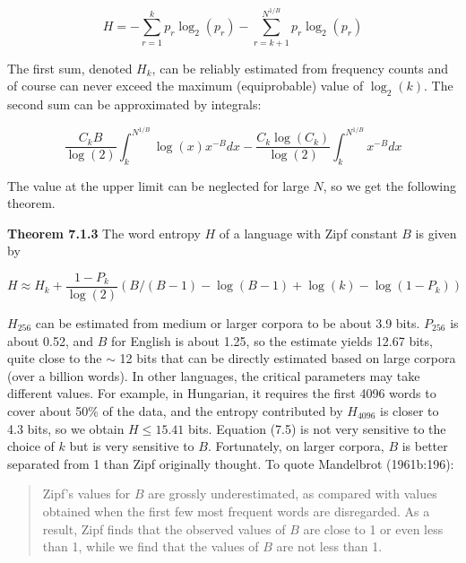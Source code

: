 \begin{equation}
H = -\sum_{r=1}^k p_r \log_2(p_r) -\sum_{r=k+1}^{N^{1/B}} p_r \log_2(p_r)
\end{equation}

\smallskip\noindent
The first sum, denoted $H_k$, can be reliably estimated from frequency counts
and of course can never exceed the maximum (equiprobable) value of
$\log_2(k)$. The second sum can be approximated by integrals:

\begin{equation}
\frac{C_kB}{\log(2)}\int_{k}^{N^{1/B}} \log(x) x^{-B} dx
-\frac{C_k\log(C_k)}{\log(2)} \int_{k}^{N^{1/B}} x^{-B} dx
\end{equation}

\smallskip\noindent
The value at the upper limit can be neglected for large $N$, so we get the 
following theorem. 

\smallskip\noindent
{\bf Theorem 7.1.3} 
The word entropy $H$ of a language with Zipf constant $B$ is given by

\begin{equation}
H \approx H_k +\frac{1-P_k}{\log(2)}(B/(B-1) -\log(B-1)+\log(k) -\log(1-P_k))
\end{equation}

\smallskip\noindent $H_{256}$ can be estimated from medium or larger corpora
to be about 3.9 bits.  $P_{256}$ is about 0.52, and $B$ for English is about
1.25, so the estimate yields 12.67 bits, quite close to the $\sim$ 12 bits
that can be directly estimated based on large corpora (over a billion words).
In other languages, the critical parameters may take different values. For
example, in Hungarian, it requires the first 4096 words to cover about 50\% of
the data, and the entropy contributed by $H_{4096}$ is closer to 4.3 bits, so
we obtain $H \leq 15.41$ bits. Equation (7.5) is not very sensitive to the
choice of $k$ but is very sensitive to $B$. Fortunately, on larger corpora,
$B$ is better separated from 1 than Zipf originally thought. To quote
Mandelbrot (1961b:196): \nocite{Mandelbrot:1961}

\begin{quote}

Zipf's values for $B$ are grossly underestimated, as compared with
values obtained when the first few most frequent words are disregarded. As a
result, Zipf finds that the observed values of $B$ are close to 1 or even less
than 1, while we find that the values of $B$ are not less than 1. 

\end{quote}

